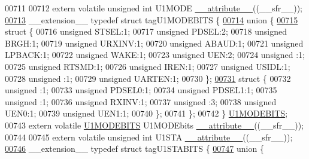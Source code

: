 \begin{DoxyCode}
00711 
00712 \textcolor{keyword}{extern} \textcolor{keyword}{volatile} \textcolor{keywordtype}{unsigned} \textcolor{keywordtype}{int}  U1MODE \hyperlink{a00009_a493c46f03454991ccc5aa7a6e1dfb2a7}{\_\_attribute\_\_}((\_\_sfr\_\_));
\hypertarget{a00009_source_l00713}{}\hyperlink{a00008}{00713} \_\_extension\_\_ \textcolor{keyword}{typedef} \textcolor{keyword}{struct }tagU1MODEBITS \{
\hypertarget{a00009_source_l00714}{}\hyperlink{a00009}{00714}   \textcolor{keyword}{union }\{
\hypertarget{a00009_source_l00715}{}\hyperlink{a00009}{00715}     \textcolor{keyword}{struct }\{
00716       \textcolor{keywordtype}{unsigned} STSEL:1;
00717       \textcolor{keywordtype}{unsigned} PDSEL:2;
00718       \textcolor{keywordtype}{unsigned} BRGH:1;
00719       \textcolor{keywordtype}{unsigned} URXINV:1;
00720       \textcolor{keywordtype}{unsigned} ABAUD:1;
00721       \textcolor{keywordtype}{unsigned} LPBACK:1;
00722       \textcolor{keywordtype}{unsigned} WAKE:1;
00723       \textcolor{keywordtype}{unsigned} UEN:2;
00724       \textcolor{keywordtype}{unsigned} :1;
00725       \textcolor{keywordtype}{unsigned} RTSMD:1;
00726       \textcolor{keywordtype}{unsigned} IREN:1;
00727       \textcolor{keywordtype}{unsigned} USIDL:1;
00728       \textcolor{keywordtype}{unsigned} :1;
00729       \textcolor{keywordtype}{unsigned} UARTEN:1;
00730     \};
\hypertarget{a00009_source_l00731}{}\hyperlink{a00009}{00731}     \textcolor{keyword}{struct }\{
00732       \textcolor{keywordtype}{unsigned} :1;
00733       \textcolor{keywordtype}{unsigned} PDSEL0:1;
00734       \textcolor{keywordtype}{unsigned} PDSEL1:1;
00735       \textcolor{keywordtype}{unsigned} :1;
00736       \textcolor{keywordtype}{unsigned} RXINV:1;
00737       \textcolor{keywordtype}{unsigned} :3;
00738       \textcolor{keywordtype}{unsigned} UEN0:1;
00739       \textcolor{keywordtype}{unsigned} UEN1:1;
00740     \};
00741   \};
00742 \} \hyperlink{a00008_d1/dea/a00829}{U1MODEBITS};
00743 \textcolor{keyword}{extern} \textcolor{keyword}{volatile} \hyperlink{a00008_d1/dea/a00829}{U1MODEBITS} U1MODEbits \hyperlink{a00009_a493c46f03454991ccc5aa7a6e1dfb2a7}{\_\_attribute\_\_}((\_\_sfr\_\_));
00744 
00745 \textcolor{keyword}{extern} \textcolor{keyword}{volatile} \textcolor{keywordtype}{unsigned} \textcolor{keywordtype}{int}  U1STA \hyperlink{a00009_a493c46f03454991ccc5aa7a6e1dfb2a7}{\_\_attribute\_\_}((\_\_sfr\_\_));
\hypertarget{a00009_source_l00746}{}\hyperlink{a00008}{00746} \_\_extension\_\_ \textcolor{keyword}{typedef} \textcolor{keyword}{struct }tagU1STABITS \{
\hypertarget{a00009_source_l00747}{}\hyperlink{a00009}{00747}   \textcolor{keyword}{union }\{

\end{DoxyCode}
